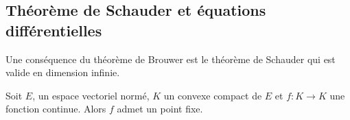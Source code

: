 \subsection{Théorème de Schauder et équations différentielles}

Une conséquence du théorème de Brouwer est le théorème de Schauder qui est valide en dimension infinie.




\begin{theorem}       \label{ThovHJXIU}
    Soit \( E\), un espace vectoriel normé, \( K\) un convexe compact de \( E\) et \( f\colon K\to K\) une fonction continue. Alors \( f\) admet un point fixe.
\end{theorem}

